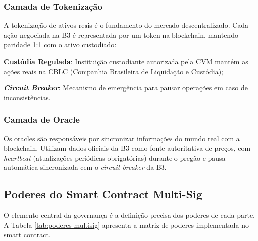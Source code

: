 \subsubsection{Camada de Tokenização}

A tokenização de ativos reais é o fundamento do mercado descentralizado. Cada ação negociada na B3 é representada por um token na blockchain, mantendo paridade 1:1 com o ativo custodiado:

\begin{alineas}
    \item \textbf{Custódia Regulada}: Instituição custodiante autorizada pela CVM mantém as ações reais na CBLC (Companhia Brasileira de Liquidação e Custódia);
    \item \textbf{\textit{Circuit Breaker}}: Mecanismo de emergência para pausar operações em caso de inconsistências.
\end{alineas}

\subsubsection{Camada de Oracle}

Os oracles são responsáveis por sincronizar informações do mundo real com a blockchain. Utilizam dados oficiais da B3 como fonte autoritativa de preços, com \textit{heartbeat} (atualizações periódicas obrigatórias) durante o pregão e pausa automática sincronizada com o \textit{circuit breaker} da B3.

\subsection{Poderes do Smart Contract Multi-Sig}

O elemento central da governança é a definição precisa dos poderes de cada parte. A Tabela \ref{tab:poderes-multisig} apresenta a matriz de poderes implementada no smart contract.

